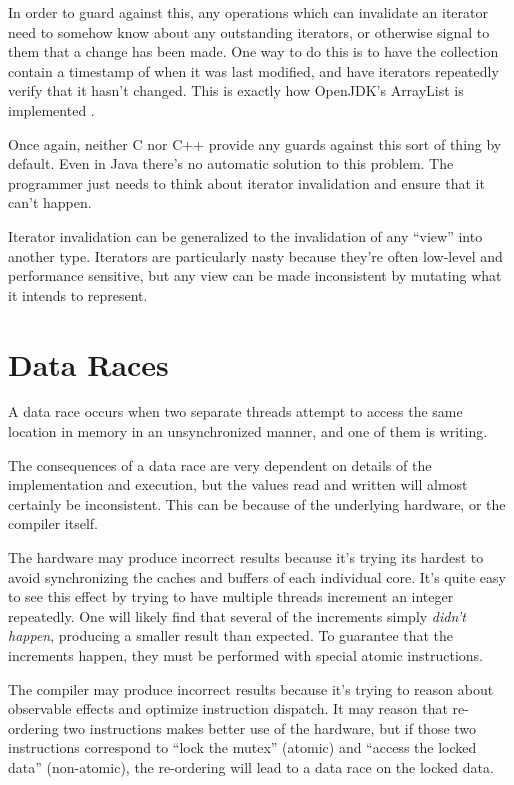 In order to guard against this, any operations which can invalidate an iterator
need to somehow know about any outstanding iterators, or otherwise signal to
them that a change has been made. One way to do this is to have the
collection contain a timestamp of when it was last modified, and have iterators
repeatedly verify that it hasn't changed. This is exactly how OpenJDK's ArrayList is
implemented \cite{jdkiter}.

Once again, neither C nor C++ provide any guards against this sort of thing
by default. Even in Java there's no automatic solution to this problem. The
programmer just needs to think about iterator invalidation and ensure that it
can't happen.

Iterator invalidation can be generalized to the invalidation of any ``view''
into another type. Iterators are particularly nasty because they're often
low-level and performance sensitive, but any view can be made
inconsistent by mutating what it intends to represent.






\section{Data Races}

A data race occurs when two separate threads attempt to access the same location
in memory in an unsynchronized manner, and one of them is writing.

The consequences of a data race are very dependent on details of the implementation
and execution, but the values read and written will almost certainly be inconsistent.
This can be because of the underlying hardware, or the compiler itself.

The hardware may produce incorrect results because it's trying its hardest to avoid
synchronizing the caches and buffers of each individual core. It's quite easy to
see this effect by trying to have multiple threads increment an integer repeatedly.
One will likely find that several of the increments simply \emph{didn't happen},
producing a smaller result than expected. To guarantee that the increments happen,
they must be performed with special atomic instructions.

The compiler may produce incorrect results because it's trying to reason about
observable effects and optimize instruction dispatch. It may reason that re-ordering
two instructions makes better use of the hardware, but if those two instructions
correspond to ``lock the mutex'' (atomic) and ``access the locked data'' (non-atomic),
the re-ordering will lead to a data race on the locked data.

